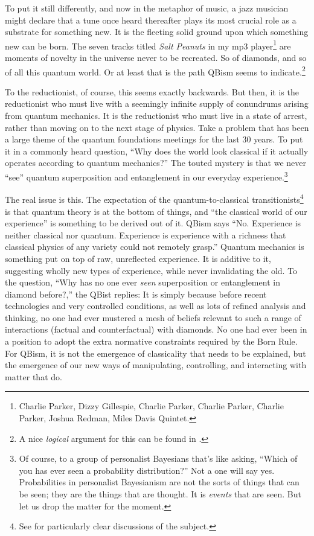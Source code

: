 To put it still differently, and now in the metaphor of music, a jazz musician might declare that a tune once heard thereafter plays its most crucial role as a substrate for something new. It is the fleeting solid ground upon which something new can be born.  The seven tracks titled {\sl Salt Peanuts\/} in my mp3 player\footnote{Charlie Parker, Dizzy Gillespie, Charlie Parker, Charlie Parker, Charlie Parker, Joshua Redman, Miles Davis Quintet.} are moments of novelty in the universe never to be recreated.  So of diamonds, and so of all this quantum world.  Or at least that is the path QBism seems to indicate.\footnote{A nice {\it logical\/} argument for this can be found in \cite{Ojima92}.}

To the reductionist, of course, this seems exactly backwards.  But then, it is the reductionist who must live with a seemingly infinite supply of conundrums arising from quantum mechanics.  It is the reductionist who must live in a state of arrest, rather than moving on to the next stage of physics.  Take a problem that has been a large theme of the quantum foundations meetings for the last 30 years.  To put it in a commonly heard question, ``Why does the world look classical if it actually operates according to quantum mechanics?''  The touted mystery is that we never ``see'' quantum superposition and entanglement in our everyday experience.\footnote{Of course, to a group of personalist Bayesians that's like asking, ``Which of you has ever seen a probability distribution?''  Not a one will say yes.  Probabilities in personalist Bayes\-ian\-ism are not the sorts of things that can be seen; they are the things that are thought.  It is {\it events\/} that are seen.  But let us drop the matter for the moment.}

The real issue is this.  The expectation of the quantum-to-classical transitionists\footnote{See \cite{Schlosshauer07,Schlosshauer08} for particularly clear discussions of the subject.} is that quantum theory is at the bottom of things, and ``the classical world of our experience'' is something to be derived out of it.  QBism says ``No.  Experience is neither classical nor quan\-tum.  Experience is experience with a richness that classical physics of any variety could not remotely grasp.''  Quantum mechanics is something put on top of raw, unreflected experience.  It is additive to it, suggesting wholly new types of experience, while never invalidating the old.  To the question, ``Why has no one ever {\it seen\/} superposition or entanglement in diamond before?,'' the QBist replies:  It is simply because before recent technologies and very controlled conditions, as well as lots of refined analysis and thinking, no one had ever mustered a mesh of beliefs relevant to such a range of interactions (factual and counterfactual) with diamonds.  No one had ever been in a position to adopt the extra normative constraints required by the Born Rule.  For QBism, it is not the emergence of classicality that needs to be explained, but the emergence of our new ways of manipulating, controlling, and interacting with matter that do.

